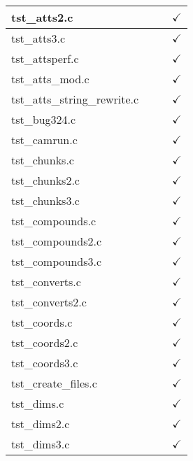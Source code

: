 \begin{table}[H]
\begin{tabular}{|l|c|c|c|}
tst\_atts2.c            &               &             & $\checkmark$    \\ \hline
tst\_atts3.c            &               &             & $\checkmark$    \\ \hline
tst\_attsperf.c         &               &             & $\checkmark$    \\ \hline
tst\_atts\_mod.c        &               &             & $\checkmark$    \\ \hline
tst\_atts\_string\_rewrite.c &          &             & $\checkmark$    \\ \hline
tst\_bug324.c           &               &             & $\checkmark$    \\ \hline
tst\_camrun.c           &               &               & $\checkmark$    \\ \hline
tst\_chunks.c           &               &               & $\checkmark$    \\ \hline
tst\_chunks2.c          &               &               & $\checkmark$    \\ \hline
tst\_chunks3.c          &               &               & $\checkmark$    \\ \hline
tst\_compounds.c        &               &               & $\checkmark$    \\ \hline
tst\_compounds2.c       &               &               & $\checkmark$    \\ \hline
tst\_compounds3.c       &               &               & $\checkmark$    \\ \hline
tst\_converts.c         &               &               & $\checkmark$    \\ \hline
tst\_converts2.c        &               &               & $\checkmark$    \\ \hline
tst\_coords.c           &               &               & $\checkmark$    \\ \hline
tst\_coords2.c          &               &               & $\checkmark$    \\ \hline
tst\_coords3.c          &               &               & $\checkmark$    \\ \hline
tst\_create\_files.c    &               &               & $\checkmark$    \\ \hline
tst\_dims.c             &               &               & $\checkmark$    \\ \hline
tst\_dims2.c            &               &               & $\checkmark$    \\ \hline
tst\_dims3.c            &               &               & $\checkmark$    \\ \hline

\end{tabular}
\end{table}
